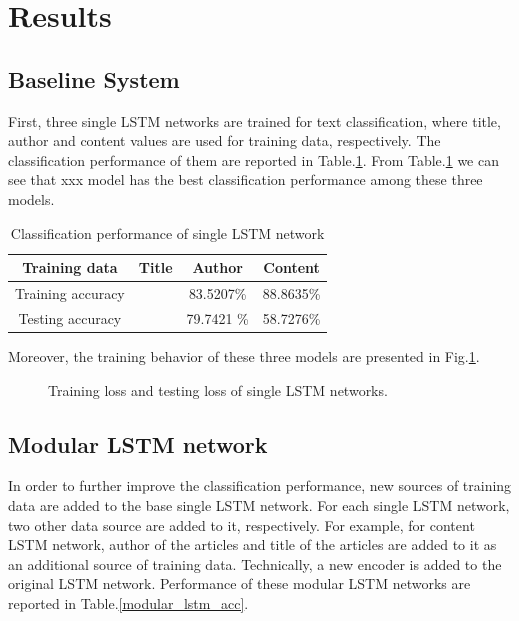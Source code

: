 \documentclass[12pt]{article}
\begin{document}
\section{Results}\label{results}

\subsection{Baseline System}

First, three single LSTM networks are trained for text classification, where title, author and content values are used for training data, respectively. The classification performance of them are reported in Table.\ref{single_lstm_acc}. From Table.\ref{single_lstm_acc} we can see that xxx model has the best classification performance among these three models.

\begin{table}[!t]
\begin{center}
\caption{Classification performance of single LSTM network}
\label{single_lstm_acc}
\begin{tabular}{c|c|c|c}
\hline
Training data & Title & Author & Content\\
\hline

Training accuracy &  & 83.5207\% & 88.8635\% \\

Testing accuracy & & 79.7421 \% & 58.7276\% \\

\hline
\end{tabular}
\end{center}
\end{table}

Moreover, the training behavior of these three models are presented in Fig.\ref{training_loss_single}.


\begin{figure}[!t]
\begin{center}
\end{center}
\caption{Training loss and testing loss of single LSTM networks.}
\label{training_loss_single}
\end{figure}



\subsection{Modular LSTM network}

In order to further improve the classification performance, new sources of training data are added to the base single LSTM network. For each single LSTM network, two other data source are added to it, respectively. For example, for content LSTM network, author of the articles and title of the articles are added to it as an additional source of training data. Technically, a new encoder is added to the original LSTM network. Performance of these modular LSTM networks are reported in Table.\ref{modular_lstm_acc}.
\end{document}
